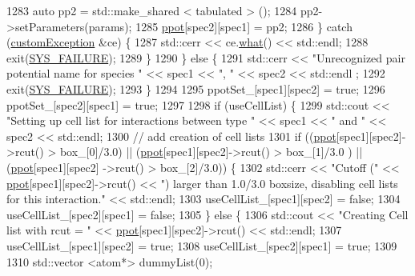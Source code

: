 \begin{DoxyCode}
1283             \textcolor{keyword}{auto} pp2 = std::make\_shared < tabulated > ();
1284             pp2->setParameters(params);
1285             \hyperlink{classsim_system_ad2e290b5963f132e6a3a56cee35c8e9f}{ppot}[spec2][spec1] = pp2;
1286         \} \textcolor{keywordflow}{catch} (\hyperlink{classcustom_exception}{customException} &ce) \{
1287             std::cerr << ce.\hyperlink{classcustom_exception_aeb6ab5848b038adfc68fde86a512f691}{what}() << std::endl;
1288             exit(\hyperlink{global_8h_a428dfe1ef0a6ff4b1fdebf275f6aff2e}{SYS\_FAILURE});
1289         \}
1290     \} \textcolor{keywordflow}{else} \{
1291         std::cerr << \textcolor{stringliteral}{"Unrecognized pair potential name for species "} << spec1 << \textcolor{stringliteral}{", "} << spec2 << std::endl
      ;
1292         exit(\hyperlink{global_8h_a428dfe1ef0a6ff4b1fdebf275f6aff2e}{SYS\_FAILURE});
1293     \}
1294 
1295     ppotSet\_[spec1][spec2] = \textcolor{keyword}{true};
1296     ppotSet\_[spec2][spec1] = \textcolor{keyword}{true};
1297 
1298     \textcolor{keywordflow}{if} (useCellList) \{
1299         std::cout << \textcolor{stringliteral}{"Setting up cell list for interactions between type "} << spec1 << \textcolor{stringliteral}{" and "} << spec2 << 
      std::endl;
1300         \textcolor{comment}{// add creation of cell lists}
1301         \textcolor{keywordflow}{if} ((\hyperlink{classsim_system_ad2e290b5963f132e6a3a56cee35c8e9f}{ppot}[spec1][spec2]->rcut() > box\_[0]/3.0) || (\hyperlink{classsim_system_ad2e290b5963f132e6a3a56cee35c8e9f}{ppot}[spec1][spec2]->rcut() > box\_[1]/3.0
      ) || (\hyperlink{classsim_system_ad2e290b5963f132e6a3a56cee35c8e9f}{ppot}[spec1][spec2] ->rcut() > box\_[2]/3.0)) \{
1302             std::cerr << \textcolor{stringliteral}{"Cutoff ("} << \hyperlink{classsim_system_ad2e290b5963f132e6a3a56cee35c8e9f}{ppot}[spec1][spec2]->rcut() << \textcolor{stringliteral}{") larger than 1.0/3.0 boxsize,
       disabling cell lists for this interaction."} << std::endl;
1303             useCellList\_[spec1][spec2] = \textcolor{keyword}{false};
1304             useCellList\_[spec2][spec1] = \textcolor{keyword}{false};
1305         \} \textcolor{keywordflow}{else} \{
1306             std::cout << \textcolor{stringliteral}{"Creating Cell list with rcut = "} << \hyperlink{classsim_system_ad2e290b5963f132e6a3a56cee35c8e9f}{ppot}[spec1][spec2]->rcut() << std::endl;
1307             useCellList\_[spec1][spec2] = \textcolor{keyword}{true};
1308             useCellList\_[spec2][spec1] = \textcolor{keyword}{true};
1309 
1310             std::vector <atom*> dummyList(0);

\end{DoxyCode}
